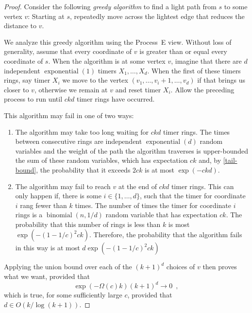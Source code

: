 \documentclass[lotsofwhite]{patmorin}
\DeclareMathOperator{\exponential}{exponential}
\DeclareMathOperator{\binomial}{binomial}
\begin{document}
\begin{proof}
   Consider the following \emph{greedy algorithm} to find a light path
   from $s$ to some vertex $v$:  Starting at $s$, repeatedly
   move across the lightest edge that reduces the distance to $v$.

   We analyze this greedy algorithm using the Process~E view. Without
   loss of generality, assume that every coordinate of $v$ is greater
   than or equal every coordinate of $s$.  When the algorithm is at some
   vertex $v$, imagine that there are $d$ independent $\exponential(1)$
   timers $X_1,\ldots,X_d$. When the first of these timers rings, say
   timer $X_i$ we move to the vertex $(v_1,\ldots,v_{i}+1,\ldots,v_d)$
   if that brings us closer to $v$, otherwise we remain at $v$ and reset
   timer $X_i$.  
   Allow the preceding process to run until $ckd$ timer rings have
   occurred.  

   This algorithm may fail in one of two ways:
   \begin{enumerate}
      \item The algorithm may take too long waiting for $ckd$ timer
       rings.  The times between consecutive rings are independent
       $\exponential(d)$ random variables and the weight of the path
       the algorithm traverses is upper-bounded the sum of these random
       variables, which has expectation $ck$ and, by \eqref{tail-bound},
       the probability that it exceeds $2ck$ is at most $\exp(-ckd)$.

      \item The algorithm may fail to reach $v$ at the end of $ckd$ timer
      rings.  This can only happen if, there is some $i\in\{1,\ldots,d\}$,
      such that the timer for coordinate $i$ rang fewer than $k$ times.
      The number of times the timer for coordinate $i$ rings is a
      $\binomial(n,1/d)$ random variable that has expectation $ck$.
      The probability that this number of rings is less than $k$ is
      most $\exp(-(1-1/c)^2ck)$.  Therefore, the probability that the 
      algorithm fails in this way is at most $d\exp(-(1-1/c)^2ck)$
   \end{enumerate} 

   Applying the union bound over each of the $(k+1)^{d}$ choices of $v$
   then proves what we want, provided that
   \[
         \exp(-\Omega(c)k) (k+1)^d \to 0 \enspace ,
   \]
   which is true, for some sufficiently large $c$, provided that $d\in O(k/\log (k+1))$.
\end{proof}
\end{document}
